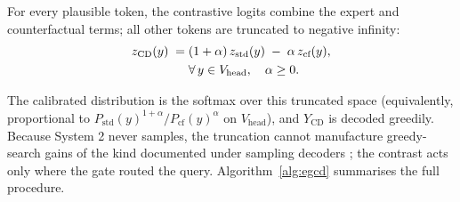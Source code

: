 \documentclass{ieeeaccess}
\begin{document}
For every plausible token, the contrastive logits combine the expert and counterfactual terms; all other tokens are truncated to negative infinity:
\begin{align}\label{eq:cd}
z_{\text{CD}}(y) \;=\;& (1 + \alpha)\, z_{\text{std}}(y) \;-\; \alpha\, z_{\text{cf}}(y),\notag\\
& \forall\, y \in V_{\text{head}}, \quad \alpha \geq 0.
\end{align}

The calibrated distribution is the softmax over this truncated space (equivalently, proportional to $P_{\text{std}}(y)^{1+\alpha} / P_{\text{cf}}(y)^{\alpha}$ on $V_{\text{head}}$), and $Y_{\text{CD}}$ is decoded greedily. Because System 2 never samples, the truncation cannot manufacture greedy-search gains of the kind documented under sampling decoders \cite{yin2025mirage,bendre2026rethinking}; the contrast acts only where the gate routed the query. Algorithm~\ref{alg:egcd} summarises the full procedure.
\end{document}
